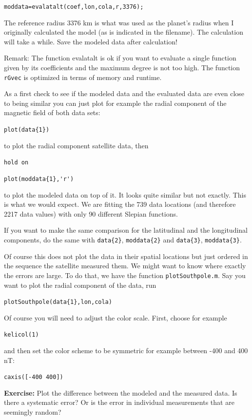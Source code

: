 \documentclass[11pt]{article}
\begin{document}
\qquad \verb+moddata=evalatalt(coef,lon,cola,r,3376);+

The reference radius 3376 km is what was used as the planet's radius when I originally calculated the model (as is indicated in the filename). The calculation will take a while. Save the modeled data after calculation!

Remark: The function evalatalt is ok if you want to evaluate a single function given by its coefficients and the maximum degree is not too high. The function \verb+rGvec+ is optimized in terms of memory and runtime.

As a first check to see if the modeled data and the evaluated data are even close to being similar you can just plot for example the radial component of the magnetic field of both data sets:

\qquad \verb+plot(data{1})+

to plot the radial component satellite data, then

\qquad \verb+hold on+

\qquad \verb+plot(moddata{1},'r')+

to plot the modeled data on top of it. It looks quite similar but not exactly. This is what we would expect. We are fitting the 739 data locations (and therefore 2217 data values) with only 90 different Slepian functions. 

If you want to make the same comparison for the latitudinal and the longitudinal components, do the same with \verb+data{2}+, \verb+moddata{2}+ and  \verb+data{3}+, \verb+moddata{3}+.

Of course this does not plot the data in their spatial locations but just ordered in the sequence the satellite measured them. We might want to know where exactly the errors are large. To do that, we have the function \verb+plotSouthpole.m+. Say you want to plot the radial component of the data, run 

\qquad \verb+plotSouthpole(data{1},lon,cola)+

Of course you will need to adjust the color scale. First, choose for example

\qquad \verb+kelicol(1)+ 

and then set the color scheme to be symmetric for example between -400 and 400 nT:

\qquad \verb+caxis([-400 400])+


\textbf{Exercise:} Plot the difference between the modeled and the measured data. Is there a systematic error? Or is the error in individual measurements that are seemingly random?
\end{document}

